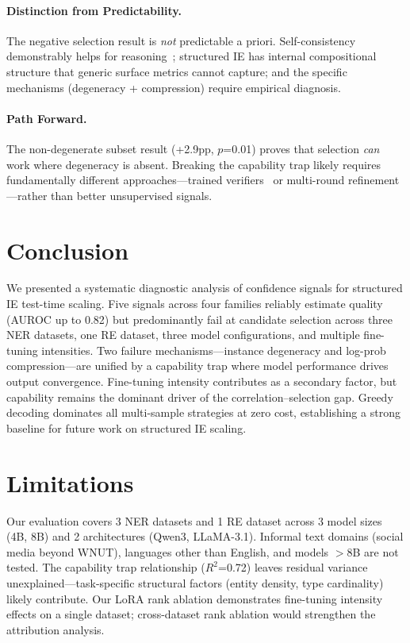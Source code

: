 \documentclass[11pt]{article}
\begin{document}
\paragraph{Distinction from Predictability.} The negative selection result is \emph{not} predictable a priori. Self-consistency demonstrably helps for reasoning~\cite{wang2023selfconsistency}; structured IE has internal compositional structure that generic surface metrics cannot capture; and the specific mechanisms (degeneracy + compression) require empirical diagnosis.

\paragraph{Path Forward.} The non-degenerate subset result (+2.9pp, $p$=0.01) proves that selection \emph{can} work where degeneracy is absent. Breaking the capability trap likely requires fundamentally different approaches---trained verifiers~\cite{cobbe2021verifiers,lightman2023stepwise} or multi-round refinement---rather than better unsupervised signals.

\section{Conclusion}

We presented a systematic diagnostic analysis of confidence signals for structured IE test-time scaling. Five signals across four families reliably estimate quality (AUROC up to 0.82) but predominantly fail at candidate selection across three NER datasets, one RE dataset, three model configurations, and multiple fine-tuning intensities. Two failure mechanisms---instance degeneracy and log-prob compression---are unified by a capability trap where model performance drives output convergence. Fine-tuning intensity contributes as a secondary factor, but capability remains the dominant driver of the correlation--selection gap. Greedy decoding dominates all multi-sample strategies at zero cost, establishing a strong baseline for future work on structured IE scaling.

\section*{Limitations}

Our evaluation covers 3 NER datasets and 1 RE dataset across 3 model sizes (4B, 8B) and 2 architectures (Qwen3, LLaMA-3.1). Informal text domains (social media beyond WNUT), languages other than English, and models $>$8B are not tested. The capability trap relationship ($R^2$=0.72) leaves residual variance unexplained---task-specific structural factors (entity density, type cardinality) likely contribute. Our LoRA rank ablation demonstrates fine-tuning intensity effects on a single dataset; cross-dataset rank ablation would strengthen the attribution analysis.
\end{document}
